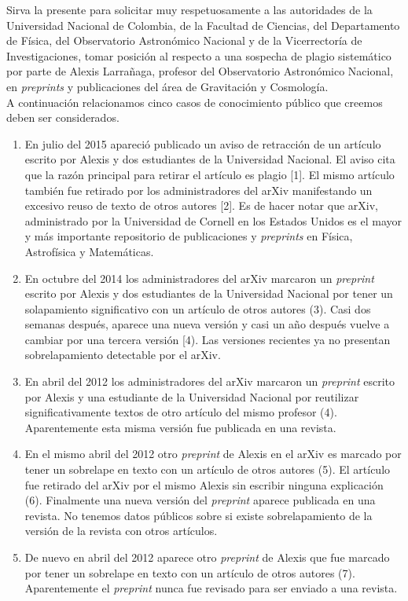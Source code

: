 \documentclass[11pt]{article}
\begin{document}
\large
Sirva la presente para solicitar muy respetuosamente a las autoridades
de la Universidad Nacional de Colombia, de la Facultad de Ciencias,
del Departamento de F\'isica, del Observatorio Astron\'omico Nacional y de
la Vicerrector\'ia de Investigaciones, tomar posici\'on al respecto a una
sospecha de plagio sistem\'atico por parte de Alexis Larra\~naga, profesor
del Observatorio Astron\'omico Nacional, en \textit{preprints} y publicaciones
del \'area de Gravitaci\'on y Cosmolog\'ia.  
\\

A continuaci\'on relacionamos cinco casos de conocimiento p\'ublico
que creemos deben ser considerados. 
\begin{enumerate}
\item En julio del 2015 apareci\'o publicado un aviso de retracci\'on de un
art\'iculo escrito por Alexis y dos estudiantes de la Universidad
Nacional.  El aviso cita que la raz\'on principal para retirar el
art\'iculo es plagio [1]. El mismo art\'iculo tambi\'en fue retirado por los
administradores del arXiv manifestando un excesivo reuso de texto de
otros autores [2]. Es de hacer notar que arXiv, administrado por la
Universidad de Cornell en los Estados Unidos es el mayor y m\'as
importante repositorio de publicaciones y \textit{preprints} en F\'isica,
Astrof\'isica y Matem\'aticas. 

\item En octubre del 2014 los administradores del arXiv marcaron un
  \textit{preprint} escrito por Alexis y dos estudiantes de la
  Universidad Nacional por tener un solapamiento significativo con
  un art\'iculo de otros autores (3). Casi dos semanas despu\'es,
  aparece una nueva versi\'on y casi un a\~no despu\'es vuelve a
  cambiar por una tercera versi\'on [4). Las versiones   recientes ya
    no presentan sobrelapamiento detectable por el arXiv.   

\item En abril del 2012 los administradores del arXiv marcaron un
  \textit{preprint} escrito por Alexis y una estudiante
  de la Universidad Nacional por reutilizar significativamente
  textos de otro art\'iculo del mismo profesor (4). Aparentemente esta
  misma versi\'on fue publicada en una revista.

\item En el mismo abril del 2012 otro \textit{preprint} de Alexis en el arXiv
  es marcado por tener un sobrelape en texto con un art\'iculo de otros
autores (5). El art\'iculo fue retirado del arXiv por el mismo Alexis
sin escribir ninguna explicaci\'on (6). Finalmente una nueva versi\'on del
\textit{preprint} aparece publicada en una revista. No tenemos datos p\'ublicos
sobre si existe sobrelapamiento de la versi\'on de la revista con otros
art\'iculos.  

\item De nuevo en abril del 2012 aparece otro \textit{preprint} de
  Alexis que fue marcado por tener un sobrelape en texto con un
  art\'iculo de otros autores (7). Aparentemente el \textit{preprint}
  nunca fue revisado para ser enviado a una revista. 
\end{enumerate}
\end{document}

